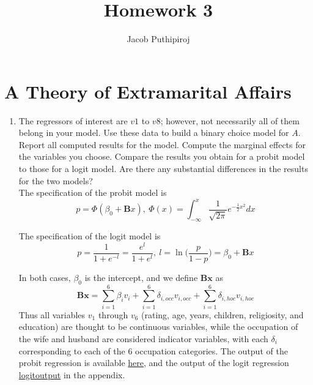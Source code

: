 \documentclass{article}
\begin{document}
\title{\vspace{-2.0cm}Homework 3}
\author{Jacob Puthipiroj}
\maketitle

\section{A Theory of Extramarital Affairs}

\begin{enumerate}[label=(\alph*)]
\item The regressors of interest are $v1$ to $v8$; however, not necessarily all of them belong in your model. Use these data to build a binary choice model for $A$. Report all computed results for the model. Compute the marginal effects for the variables you choose. Compare the results you obtain for a probit model to those for a logit model. Are there any substantial differences in the results for the two models?\\

The specification of the probit model is 
$$ p = \Phi(\beta_0 + \textbf{B}x), \ \Phi(x) = \int_{-\infty}^x \frac{1}{\sqrt{2 \pi } } e^{-\frac{1}{2}x^2} dx$$


The specification of the logit model is 
$$ p = \frac{1}{1+e^{-l}} = \frac{e^l}{1 + e^l}, \ l = \ln \Big( \frac{p}{1-p} \Big) = \beta_0 + \textbf{B}x$$

In both cases, $\beta_0$ is the intercept, and we define $\textbf{Bx}$ as
$$ \textbf{B}\textbf{x} = \sum_{i=1}^6\beta_i v_i + \sum_{i=1}^6\delta_{i,occ} v_{i,occ} +\sum_{i=1}^6 \delta_{i,hoc} v_{i,hoc}$$
Thus all variables $v_1$ through $v_6$ (rating, age, years, children, religiosity, and education) are thought to be continuous variables, while the occupation of the wife and husband are considered indicator variables, with each $\delta_i$ corresponding to each of the 6 occupation categories. The output of the probit regression is available \hyperlink{probitoutput}{here}, and the output of the logit regression \hyperlink{here}{logitoutput} in the appendix. \\


\end{enumerate}
\end{document}
